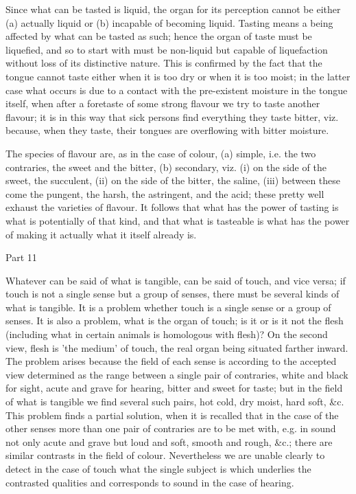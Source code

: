 Since what can be tasted is liquid, the organ for its perception cannot
be either (a) actually liquid or (b) incapable of becoming liquid.
Tasting means a being affected by what can be tasted as such; hence
the organ of taste must be liquefied, and so to start with must be
non-liquid but capable of liquefaction without loss of its distinctive
nature. This is confirmed by the fact that the tongue cannot taste
either when it is too dry or when it is too moist; in the latter case
what occurs is due to a contact with the pre-existent moisture in
the tongue itself, when after a foretaste of some strong flavour we
try to taste another flavour; it is in this way that sick persons
find everything they taste bitter, viz. because, when they taste,
their tongues are overflowing with bitter moisture. 

The species of flavour are, as in the case of colour, (a) simple,
i.e. the two contraries, the sweet and the bitter, (b) secondary,
viz. (i) on the side of the sweet, the succulent, (ii) on the side
of the bitter, the saline, (iii) between these come the pungent, the
harsh, the astringent, and the acid; these pretty well exhaust the
varieties of flavour. It follows that what has the power of tasting
is what is potentially of that kind, and that what is tasteable is
what has the power of making it actually what it itself already is.

Part 11

Whatever can be said of what is tangible, can be said of touch, and
vice versa; if touch is not a single sense but a group of senses,
there must be several kinds of what is tangible. It is a problem whether
touch is a single sense or a group of senses. It is also a problem,
what is the organ of touch; is it or is it not the flesh (including
what in certain animals is homologous with flesh)? On the second view,
flesh is 'the medium' of touch, the real organ being situated farther
inward. The problem arises because the field of each sense is according
to the accepted view determined as the range between a single pair
of contraries, white and black for sight, acute and grave for hearing,
bitter and sweet for taste; but in the field of what is tangible we
find several such pairs, hot cold, dry moist, hard soft, &c. This
problem finds a partial solution, when it is recalled that in the
case of the other senses more than one pair of contraries are to be
met with, e.g. in sound not only acute and grave but loud and soft,
smooth and rough, &c.; there are similar contrasts in the field of
colour. Nevertheless we are unable clearly to detect in the case of
touch what the single subject is which underlies the contrasted qualities
and corresponds to sound in the case of hearing. 

